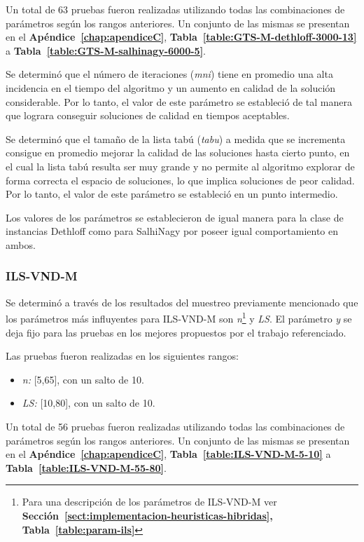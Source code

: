 Un total de 63 pruebas fueron realizadas utilizando todas las combinaciones de parámetros según los rangos anteriores. Un conjunto de las mismas se presentan en el \textbf{Apéndice~\ref{chap:apendiceC}}, 
\textbf{Tabla~\ref{table:GTS-M-dethloff-3000-13}} a \textbf{Tabla~\ref{table:GTS-M-salhinagy-6000-5}}.

Se determinó que el número de iteraciones (\emph{mni}) tiene en promedio una alta incidencia en el tiempo del algoritmo y un aumento en calidad de la solución considerable. Por lo tanto, el valor de este parámetro se estableció de tal manera que lograra conseguir soluciones de calidad en tiempos aceptables.

Se determinó que el tamaño de la lista tabú (\emph{tabu}) a medida que se incrementa consigue en promedio mejorar la calidad de las soluciones hasta cierto punto, en el cual la lista tabú resulta ser muy grande y no permite al algoritmo explorar de forma correcta el espacio de soluciones, lo que implica soluciones de peor calidad. Por lo tanto, el valor de este parámetro se estableció en un punto intermedio.

Los valores de los parámetros se establecieron de igual manera para la clase de instancias Dethloff como para SalhiNagy por poseer igual comportamiento en ambos.\\

\subsubsection*{ILS-VND-M}

Se determinó a través de los resultados del muestreo previamente mencionado que los parámetros más influyentes para ILS-VND-M son \emph{n}\footnote{Para una descripción de los parámetros de ILS-VND-M ver \textbf{Sección~\ref{sect:implementacion-heuristicas-hibridas}, Tabla~\ref{table:param-ils}}} y \emph{LS}. El parámetro \emph{y} se deja fijo para las pruebas en los mejores propuestos por el trabajo referenciado.

Las pruebas fueron realizadas en los siguientes rangos:

\begin{itemize}
\item \emph{n:} [5,65], con un salto de 10.
\item \emph{LS:} [10,80], con un salto de 10.
\end{itemize}

Un total de 56 pruebas fueron realizadas utilizando todas las combinaciones de parámetros según los rangos anteriores. Un conjunto de las mismas se presentan en el \textbf{Apéndice~\ref{chap:apendiceC}}, \textbf{Tabla~\ref{table:ILS-VND-M-5-10}}  
a \textbf{Tabla~\ref{table:ILS-VND-M-55-80}}.

